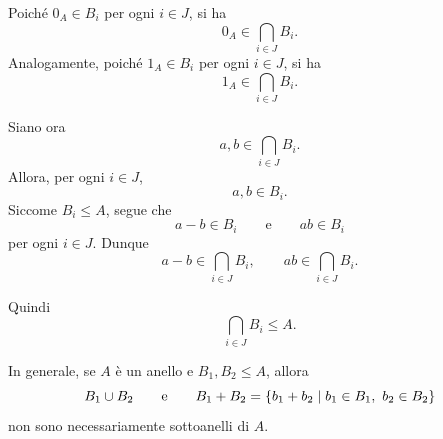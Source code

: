 \documentclass[a4paper]{article}
\begin{document}
\begin{radioactive}
\begin{snippetproof}{}
    Poiché \(0_A\in B_i\) per ogni \(i\in J\), si ha
    \[
        0_A\in \bigcap_{i\in J} B_i.
    \]
    Analogamente, poiché \(1_A\in B_i\) per ogni \(i\in J\), si ha
    \[
        1_A\in \bigcap_{i\in J} B_i.
    \]

    Siano ora
    \[
        a,b \in \bigcap_{i\in J} B_i.
    \]
    Allora, per ogni \(i\in J\),
    \[
        a,b \in B_i.
    \]
    Siccome \(B_i\leq A\), segue che
    \[
        a-b \in B_i
        \qquad
        \text{e}
        \qquad
        ab \in B_i
    \]
    per ogni \(i\in J\). Dunque
    \[
        a-b \in \bigcap_{i\in J} B_i,
        \qquad
        ab \in \bigcap_{i\in J} B_i.
    \]

    Quindi
    \[
        \bigcap_{i\in J} B_i
        \leq A.
    \]
\end{snippetproof}
\end{radioactive}

\pagebreak

\begin{radioactive}
\begin{snippetproposition}{}
    In generale, se \(A\) è un anello e \(B_1,B_2 \leq A\), allora
    \[
        B_1 \cup B_2
        \qquad
        \text{e}
        \qquad
        B_1+B_2=\{b_1+b_2 \mid b_1\in B_1,\ b_2\in B_2\}
    \]
    non sono necessariamente sottoanelli di \(A\).
\end{snippetproposition}
\end{radioactive}
\end{document}
